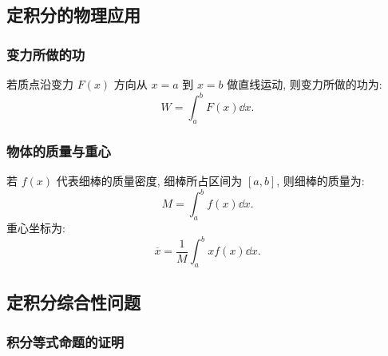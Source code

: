 \subsection{定积分的物理应用}

\subsubsection{变力所做的功}

\begin{theorem}[变力的功]
    若质点沿变力 $F(x)$ 方向从 $x=a$ 到 $x=b$ 做直线运动, 则变力所做的功为:
    $$W=\int_{a}^{b}F(x)\dd x.$$
\end{theorem}

\subsubsection{物体的质量与重心}

\begin{theorem}[质量与重心坐标公式]
    若 $f(x)$ 代表细棒的质量密度, 细棒所占区间为 $[a,b]$, 则细棒的质量为:
    $$M=\int_{a}^{b}f(x)\dd x.$$
    重心坐标为:
    $$\overline{x}=\dfrac{1}{M}\int_{a}^{b}xf(x)\dd x.$$
\end{theorem}

\subsection{定积分综合性问题}

\subsubsection{积分等式命题的证明}

